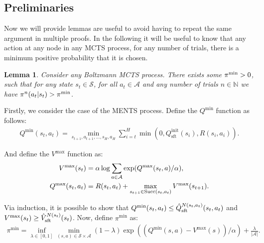 \documentclass{article}
\newcommand{\bb}[1]{\mathbb{#1}}
\newcommand{\cl}[1]{\mathcal{#1}}
\newcommand{\Vst}[2]{\hat{V}^{#2}_{\textnormal{sft}}(#1)}
\newcommand{\Qst}[3]{\hat{Q}^{#3}_{\textnormal{sft}}(#1,#2)}
\newcommand{\succc}[2]{\textnormal{Succ}(#1,#2)}
\theoremstyle{plain}
\newtheorem{lemma}[theorem]{Lemma}
\newenvironment{proofoutline}{\proof[Proof outline]}{\endproof}
\begin{document}
\begin{appendices}
    

    
    
    





    
    
    
    
    
    
    
    
    \subsection{Preliminaries} \label{app:preliminaries}
    
        Now we will provide lemmas are useful to avoid having to repeat the same argument in multiple proofs. In the following it will be useful to know that any action at any node in any MCTS process, for any number of trials, there is a minimum positive probability that it is chosen. 
        \begin{lemma} \label{lem:min_prob}
             Consider any Boltzmann MCTS process. There exists some $\pi^{\textnormal{min}}>0$, such that for any state $s_t\in\cl{S}$, for all $a_t\in\cl{A}$ and any number of trials $n\in\bb{N}$ we have $\pi^n(a_t|s_t)>\pi^{\textnormal{min}}$.
        \end{lemma}
        \begin{proofoutline}
            Firstly, we consider the case of the MENTS process. Define the $Q^{\min}$ function as follows:
            \begin{align}
                Q^{\min}(s_t,a_t) = \min_{s_{t+1},a_{t+1},...,s_H,a_H} \sum_{i=t}^H \min(0, Q^{\text{init}}_{\text{sft}}(s_i), R(s_i,a_i)).
            \end{align}
            
            And define the $V^{\max}$ function as:
            \begin{align}
                V^{\max}(s_t) &= \alpha \log \sum_{a\in\cl{A}} \exp (Q^{\max}(s_t,a)/\alpha), \label{appeq:vmax} \\
                Q^{\max}(s_t,a_t) &= R(s_t,a_t)+\max_{s_{t+1}\in\succc{s_t}{a_t}} V^{\max}(s_{t+1}).
            \end{align}
            
            Via induction, it is possible to show that $Q^{\min}(s_t,a_t)\leq \Qst{s_t}{a_t}{N(s_t,a_t)}$ and $V^{\max}(s_t)\geq \Vst{s_t}{N(s_t)}$. Now, define $\pi^{\min}$ as:
            \begin{align}
                \pi^{\min} = \inf_{\lambda\in[0,1]} \min_{(s,a)\in\cl{S}\times\cl{A}} (1-\lambda) \exp\left(\left(Q^{\min}(s,a)-V^{\max}(s)\right)/\alpha\right) + \frac{\lambda}{|\cl{A}|}. \label{eq:pi_min}
            \end{align}
            

\end{proofoutline}
\end{appendices}
\end{document}
